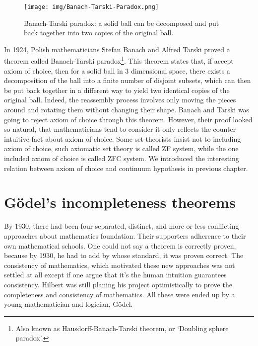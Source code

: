 \documentclass{article}
\begin{document}
\begin{figure}[htbp]
 \centering
 \texttt{[image: img/Banach-Tarski-Paradox.png]}
 \caption{Banach-Tarski paradox: a solid ball can be decomposed and put back together into two copies of the original ball.}
 \label{fig:Banach-Tarski-Paradox}
\end{figure}

 
In 1924, Polish mathematicians Stefan Banach and Alfred Tarski proved a theorem called Banach-Tarski paradox\footnote{Also known as Hausdorff-Banach-Tarski theorem, or `Doubling sphere paradox'.}. This theorem states that, if accept axiom of choice, then for a solid ball in 3 dimensional space, there exists a decomposition of the ball into a finite number of disjoint subsets, which can then be put back together in a different way to yield two identical copies of the original ball. Indeed, the reassembly process involves only moving the pieces around and rotating them without changing their shape. Banach and Tarski was going to reject axiom of choice through this theorem. However, their proof looked so natural, that mathematicians tend to consider it only reflects the counter intuitive fact about axiom of choice. Some set-theorists insist not to including axiom of choice, such axiomatic set theory is called ZF system, while the one included axiom of choice is called ZFC system. We introduced the interesting relation between axiom of choice and continuum hypothesis in previous chapter.

\section{Gödel's incompleteness theorems}

By 1930, there had been four separated, distinct, and more or less conflicting approaches about mathematics foundation. Their supporters adherence to their own mathematical schools. One could not say a theorem is correctly proven, because by 1930, he had to add by whose standard, it was proven correct. The consistency of mathematics, which motivated these new approaches was not settled at all except if one argue that it's the human intuition guarantees consistency\cite{M-Kline-2007}. Hilbert was still planing his project optimistically to prove the completeness and consistency of mathematics. All these were ended up by a young mathematician and logician, Gödel.
\end{document}
